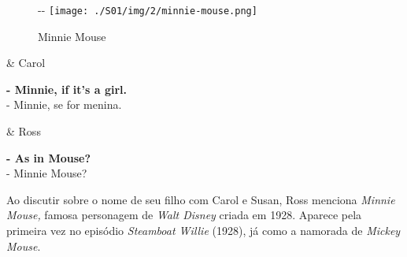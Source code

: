 \begin{figure}[!ht]
  \begin{adjustwidth}{-\oddsidemargin-1in}{-\rightmargin}
    \centering
    \texttt{[image: ./S01/img/2/minnie-mouse.png]}
    \caption{Minnie Mouse\label{fig:minnie-mouse}}
  \end{adjustwidth}
\end{figure}

\begin{tcolorbox}[enhanced,center upper,
    drop fuzzy shadow southeast, boxrule=0.3pt,
    lower separated=false,
    colframe=black!30!dialogoBorder,colback=white]
\begin{minipage}[c]{0.14\linewidth}
   & \centering \scriptsize{Carol}
\end{minipage}
\hspace{.1mm}
\begin{minipage}[c]{0.8\linewidth}
  \textbf{- Minnie, if it's a girl.}\\
  - Minnie, se for menina.
\end{minipage}

\medskip
\begin{minipage}[c]{0.14\linewidth}
   & \centering \scriptsize{Ross}
\end{minipage}
\hspace{.1mm}
\begin{minipage}[c]{0.8\linewidth}
  \textbf{- As in Mouse?}\\
  - Minnie Mouse?
\end{minipage}
\end{tcolorbox}

Ao discutir sobre o nome de seu filho com Carol e Susan, Ross menciona
\emph{Minnie Mouse,} famosa personagem de \emph{Walt Disney} criada em
1928. Aparece pela primeira vez no episódio \emph{Steamboat Willie}
(1928), já como a namorada de \emph{Mickey Mouse}.

